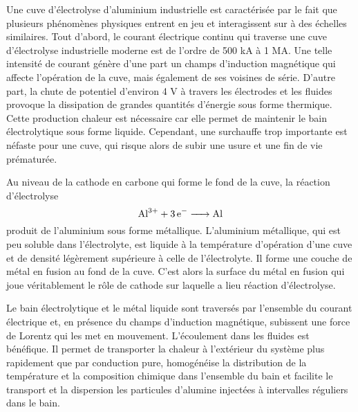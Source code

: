 Une cuve d'électrolyse d'aluminium industrielle est caractérisée par
le fait que plusieurs phénomènes physiques entrent en jeu et
interagissent sur à des échelles similaires. Tout d'abord, le courant
électrique continu qui traverse une cuve d'électrolyse industrielle
moderne est de l'ordre de \num{500} \si{\kilo\ampere} à \num{1}
\si{\mega\ampere}. Une telle intensité de courant génère d'une part un
champs d'induction magnétique qui affecte l'opération de la cuve, mais
également de ses voisines de série. D'autre part, la chute de
potentiel d'environ \num{4} \si{\volt} à travers les électrodes et les
fluides \cite{Haupin1995} provoque la dissipation de grandes quantités
d'énergie sous forme thermique. Cette production chaleur est
nécessaire car elle permet de maintenir le bain électrolytique sous
forme liquide. Cependant, une surchauffe trop importante est
néfaste pour une cuve, qui risque alors de subir une usure et une
fin de vie prématurée.

Au niveau de la cathode en carbone qui forme le fond de la cuve, la
réaction d'électrolyse
\begin{equation}
\cee{Al^{3+} + 3e^- -> Al}
\end{equation}
produit de l'aluminium sous forme métallique. L'aluminium métallique,
qui est peu soluble dans l'électrolyte, est liquide à la température
d'opération d'une cuve et de densité légèrement supérieure à celle de
l'électrolyte. Il forme une couche de métal en fusion au fond de la
cuve. C'est alors la surface du métal en fusion qui joue véritablement
le rôle de cathode sur laquelle a lieu réaction d'électrolyse.

Le bain électrolytique et le métal liquide sont traversés par
l'ensemble du courant électrique et, en présence du champs d'induction
magnétique, subissent une force de Lorentz qui les met en
mouvement. L'écoulement dans les fluides est bénéfique. Il permet de
transporter la chaleur à l'extérieur du système plus rapidement que
par conduction pure, homogénéise la distribution de la température et
la composition chimique dans l'ensemble du bain et facilite le
transport et la dispersion les particules d'alumine injectées à
intervalles réguliers dans le bain.

